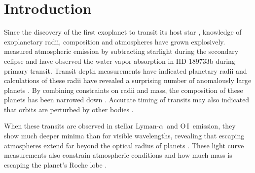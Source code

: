 \documentclass[twocolumn]{emulateapj}
\newcommand{\oi}{\ensuremath{\mathrm{O}\,\scriptstyle \mathrm{I}}}
\newcommand{\lya}{Lyman-$\alpha$}
\begin{document}


\section{Introduction}
Since the discovery of the first exoplanet to transit its host star \citep{charbd,henryd}, knowledge of exoplanetary radii, composition and atmospheres have grown explosively. \citet{therm} measured atmospheric emission by subtracting starlight during the secondary eclipse and \citet{waterabs} have observed the water vapor absorption in  HD 189733b during primary transit. Transit depth measurements have indicated planetary radii and calculations of these radii have revealed a surprising number of anomalously large planets \citep{socrates,ohmd}. By combining constraints on radii and mass, the composition of these planets has been narrowed down \citep{degen}. Accurate timing of transits may also indicated that orbits are perturbed by other bodies \citep{winnchap}.

When these transits are observed in stellar \lya\ and \oi\ emission, they show much deeper minima than for visible wavelengths, revealing that escaping atmospheres extend far beyond the optical radius of planets \citep{vidmad,benjaf7,mclay,lecav,fossati}. These light curve measurements also constrain atmospheric conditions and how much mass is escaping the planet's Roche lobe \citep{knutsonprop,gmunoz,linsky}.
\end{document}

